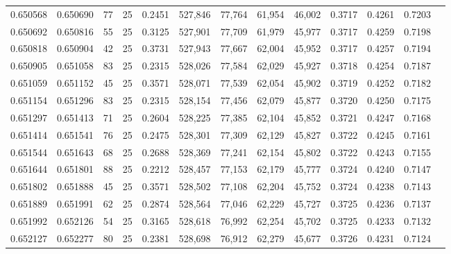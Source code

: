 \begin{tabular}{rrrrrrrrrrrrr}
0.650568 & 0.650690 &    77 &  25 &                                     0.2451 & 527,846 &  77,764 &  61,954 &  46,002 & 0.3717 & 0.4261 & 0.7203 \\
0.650692 & 0.650816 &    55 &  25 &                                     0.3125 & 527,901 &  77,709 &  61,979 &  45,977 & 0.3717 & 0.4259 & 0.7198 \\
0.650818 & 0.650904 &    42 &  25 &                                     0.3731 & 527,943 &  77,667 &  62,004 &  45,952 & 0.3717 & 0.4257 & 0.7194 \\
0.650905 & 0.651058 &    83 &  25 &                                     0.2315 & 528,026 &  77,584 &  62,029 &  45,927 & 0.3718 & 0.4254 & 0.7187 \\
0.651059 & 0.651152 &    45 &  25 &                                     0.3571 & 528,071 &  77,539 &  62,054 &  45,902 & 0.3719 & 0.4252 & 0.7182 \\
0.651154 & 0.651296 &    83 &  25 &                                     0.2315 & 528,154 &  77,456 &  62,079 &  45,877 & 0.3720 & 0.4250 & 0.7175 \\
0.651297 & 0.651413 &    71 &  25 &                                     0.2604 & 528,225 &  77,385 &  62,104 &  45,852 & 0.3721 & 0.4247 & 0.7168 \\
0.651414 & 0.651541 &    76 &  25 &                                     0.2475 & 528,301 &  77,309 &  62,129 &  45,827 & 0.3722 & 0.4245 & 0.7161 \\
0.651544 & 0.651643 &    68 &  25 &                                     0.2688 & 528,369 &  77,241 &  62,154 &  45,802 & 0.3722 & 0.4243 & 0.7155 \\
0.651644 & 0.651801 &    88 &  25 &                                     0.2212 & 528,457 &  77,153 &  62,179 &  45,777 & 0.3724 & 0.4240 & 0.7147 \\
0.651802 & 0.651888 &    45 &  25 &                                     0.3571 & 528,502 &  77,108 &  62,204 &  45,752 & 0.3724 & 0.4238 & 0.7143 \\
0.651889 & 0.651991 &    62 &  25 &                                     0.2874 & 528,564 &  77,046 &  62,229 &  45,727 & 0.3725 & 0.4236 & 0.7137 \\
0.651992 & 0.652126 &    54 &  25 &                                     0.3165 & 528,618 &  76,992 &  62,254 &  45,702 & 0.3725 & 0.4233 & 0.7132 \\
0.652127 & 0.652277 &    80 &  25 &                                     0.2381 & 528,698 &  76,912 &  62,279 &  45,677 & 0.3726 & 0.4231 & 0.7124 \\

\end{tabular}
